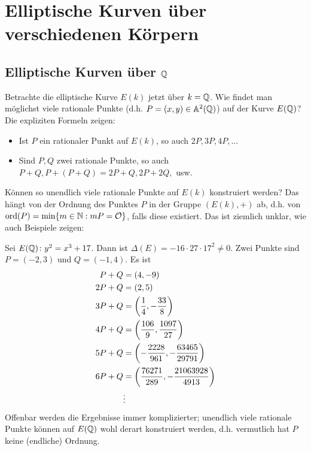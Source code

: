 \section{Elliptische Kurven über verschiedenen Körpern}
\label{sec:para3}
\nextlecture
\subsection{Elliptische Kurven über $\mathbb{Q}$}
\label{sub:3.1}

\begin{mot}
	Betrachte die elliptische Kurve $E(k)$ jetzt über $k = \mathbb{Q}$. \marginnote{[16]}
	Wie findet man möglichst viele rationale Punkte (d.h. $P=(x,y) \in \mathbb{A}^2(\mathbb{Q})$) auf der Kurve $E(\mathbb{Q})$?
	Die expliziten Formeln zeigen:
	\begin{itemize}
		\item Ist $P$ ein rationaler Punkt auf $E(k)$, so auch $2P, 3P, 4P, \dots$
		\item Sind $P,Q$ zwei rationale Punkte, so auch $P+Q, P+(P+Q) = 2P + Q, 2P + 2Q,$ usw.
	\end{itemize}
	Können so unendlich viele rationale Punkte auf $E(k)$ konstruiert werden?
	Das hängt von der Ordnung des Punktes $P$ in der Gruppe $(E(k),+)$ ab, d.h. von $\operatorname{ord}(P) = \min\{m \in \mathbb{N} : mP = \mathcal{O}\}$, falls diese existiert.
	Das ist ziemlich unklar, wie auch Beispiele zeigen:
\end{mot}

\begin{bsp}
\label{bsp_16.2}
	Sei $E(\mathbb{Q}) \colon y^2 = x^3 + 17$.
	Dann ist $\Delta(E) = -16 \cdot 27 \cdot 17^2 \neq 0$.
	Zwei Punkte sind $P = (-2,3)$ und $Q = (-1,4)$.
	Es ist
	\begin{equation}
	\begin{aligned}
		P + Q &= (4,-9) \\
		2P + Q &= (2,5) \\
		3P + Q &= \left(\frac{1}{4}, - \frac{33}{8}\right) \\
		4P + Q &= \left(\frac{106}{9}, \frac{1097}{27}\right) \\
		5P + Q &= \left(-\frac{2228}{961},-\frac{63465}{29791}\right)\\
		6P + Q &= \left(\frac{76271}{289},-\frac{21063928}{4913}\right) \\
		&\vdots
	\end{aligned}
	\end{equation}
	Offenbar werden die Ergebnisse immer komplizierter; unendlich viele rationale Punkte können auf $E(\mathbb{Q})$ wohl derart konstruiert werden, d.h. vermutlich hat $P$ keine (endliche) Ordnung.
\end{bsp}

